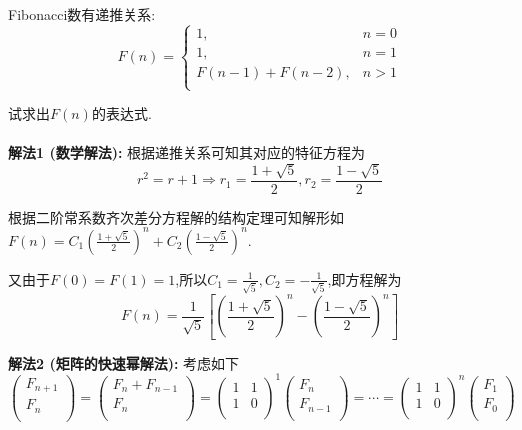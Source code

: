 \documentclass{article}
\begin{document}
\pagebreak


\begin{homeworkProblem}

	Fibonacci数有递推关系: 
	$$
	F(n)=\begin{cases}
		1,&		n=0\\
		1,&		n=1\\
		F(n-1)+F(n-2),&		n>1\\
	\end{cases}
	$$
	
	试求出$F(n)$的表达式.
	\\

	\solution
	\\

	\textbf{解法1 (数学解法):} 根据递推关系可知其对应的特征方程为$$\displaystyle r^2=r+1\Rightarrow r_1=\frac{1+\sqrt{5}}{2}, r_2=\frac{1-\sqrt{5}}{2}$$

	根据二阶常系数齐次差分方程解的结构定理可知解形如$\displaystyle F\left( n \right) =C_1\left( \frac{1+\sqrt{5}}{2} \right) ^n+C_2\left( \frac{1-\sqrt{5}}{2} \right) ^n$.
	
	又由于$F(0)=F(1)=1$,所以$\displaystyle C_1=\frac{1}{\sqrt{5}}, C_2=-\frac{1}{\sqrt{5}}$,即方程解为$$\displaystyle F\left( n \right) =\frac{1}{\sqrt{5}}\left[ \left( \frac{1+\sqrt{5}}{2} \right) ^n-\left( \frac{1-\sqrt{5}}{2} \right) ^n \right]	$$

	\textbf{解法2 (矩阵的快速幂解法):} 考虑如下$$
	\left( \begin{array}{c}
		F_{n+1}\\
		F_n\\
	\end{array} \right) =\left( \begin{array}{c}
		F_n+F_{n-1}\\
		F_n\\
	\end{array} \right) =\left( \begin{matrix}
		1&		1\\
		1&		0\\
	\end{matrix} \right) ^1\left( \begin{array}{c}
		F_n\\
		F_{n-1}\\
	\end{array} \right) =\cdots =\left( \begin{matrix}
		1&		1\\
		1&		0\\
	\end{matrix} \right) ^n\left( \begin{array}{c}
		F_1\\
		F_0\\
	\end{array} \right) 
	$$


\end{homeworkProblem}
\end{document}
